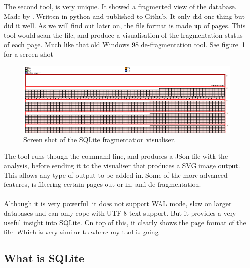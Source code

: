 The second tool, is very unique. It showed a fragmented view of the database. Made by \cite{sqlitefrag}. Written in python and published to Github. It only did one thing but did it well. As we will find out later on, the file format is made up of pages. This tool would scan the file, and produce a visualisation of the fragmentation status of each page. Much like that old Windows 98 de-fragmentation tool. See figure~\ref{fig:db_visualizer} for a screen shot.

\begin{figure}[H]
	\centering
	\includegraphics[scale=0.85]{images/db_visualizer.png}
	\caption{Screen shot of the SQLite fragmentation visualiser. \citep{sqlitefrag}}
	\label{fig:db_visualizer}
\end{figure}

The tool runs though the command line, and produces a JSon file with the analysis, before sending it to the visualiser that produces a SVG image output. This allows any type of output to be added in. Some of the more advanced features, is filtering certain pages out or in, and de-fragmentation. 
\\\\
Although it is very powerful, it does not support WAL mode, slow on larger databases and can only cope with UTF-8 text support. But it provides a very useful insight into SQLite. On top of this, it clearly shows the page format of the file. Which is very similar to where my tool is going.

\subsection{What is SQLite}
\label{subsec:what_is_sqlite}

